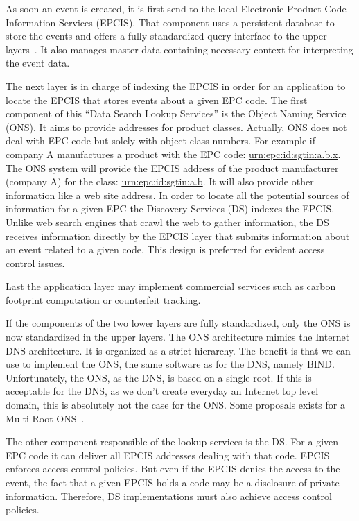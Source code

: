 \documentclass[a4paper]{llncs}
\begin{document}
As soon an event is created, it is first send to the local Electronic Product
Code Information Services (EPCIS). That component uses a persistent database to
store the events and offers a fully standardized query interface to the upper
layers~\cite{epcis}.
It also manages master data containing necessary context
for interpreting the event data.

The next layer is in charge of indexing the EPCIS in order for an application
to locate the EPCIS that stores events about a given EPC code. The first component of this
``Data Search Lookup Services''  is the Object Naming Service (ONS).
It aims to provide addresses for product
classes. Actually, ONS does not deal with EPC code but solely  with object
class numbers.  For example if company A manufactures a product with the EPC
code: \url{urn:epc:id:sgtin:a.b.x}. The ONS system will provide the EPCIS
address of the product manufacturer (company A) for the class:
\url{urn:epc:id:sgtin:a.b}. It will also provide other information like a web
site address.
In order to locate all the potential sources of information for a given EPC
the Discovery Services (DS) indexes the EPCIS. Unlike web search engines that
crawl the web to gather information, the DS receives information directly by
the EPCIS layer that submits information about an event related to a given
code. This design is preferred for evident access control issues. 

Last the application layer may implement commercial services such as carbon footprint
computation or counterfeit tracking. 

If the components of the two lower layers are fully standardized, only the ONS
is now standardized in the upper layers. The ONS architecture mimics the
Internet DNS architecture. It is organized as a strict hierarchy. The benefit
is that we can use to implement the ONS, the same software as for the DNS,
namely BIND.%
Unfortunately, the ONS, as the DNS, is based on a single root. If this is
acceptable for the DNS, as we don't create everyday an Internet top level
domain, this is absolutely not the case for the ONS. Some proposals exists for
a Multi Root ONS~\cite{DBLP:conf/iot/EvdokimovFG08,wings}.

The other component responsible of the lookup services is the DS. 
For a given EPC code it can deliver all EPCIS addresses dealing with that
code. EPCIS enforces access control policies. But even if the EPCIS denies the
access to the event, the fact that a given EPCIS holds a code may be a
disclosure of private information. Therefore, DS implementations must also
achieve access control policies.  
\end{document}
